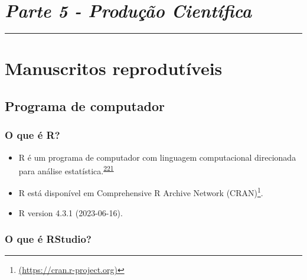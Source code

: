 \documentclass[
  a4paper,
]{book}
\renewcommand{\href}[2]{#2\footnote{\url{#1}}}
\begin{document}

\hypertarget{parte-5---produuxe7uxe3o-cientuxedfica}{%
\chapter*{\texorpdfstring{\emph{Parte 5 - Produção Científica}}{Parte 5 - Produção Científica}}\label{parte-5---produuxe7uxe3o-cientuxedfica}}

\markboth{}{}
\par\noindent\rule{\textwidth}{0.05in}

\hypertarget{manuscritos-reprodutiveis}{%
\chapter{\texorpdfstring{\textbf{Manuscritos reprodutíveis}}{Manuscritos reprodutíveis}}\label{manuscritos-reprodutiveis}}

\hypertarget{inicio}{%
\section{Programa de computador}\label{inicio}}

\hypertarget{o-que-uxe9-r}{%
\subsection{O que é R?}\label{o-que-uxe9-r}}

\begin{itemize}
\item
  R é um programa de computador com linguagem computacional direcionada para análise estatística.\textsuperscript{\protect\hyperlink{ref-ihaka1996}{221}}
\item
  R está disponível em \href{(https://cran.r-project.org)}{Comprehensive R Archive Network (CRAN)}.
\item
  R version 4.3.1 (2023-06-16).
\end{itemize}

\hypertarget{o-que-uxe9-rstudio}{%
\subsection{O que é RStudio?}\label{o-que-uxe9-rstudio}}
\end{document}
